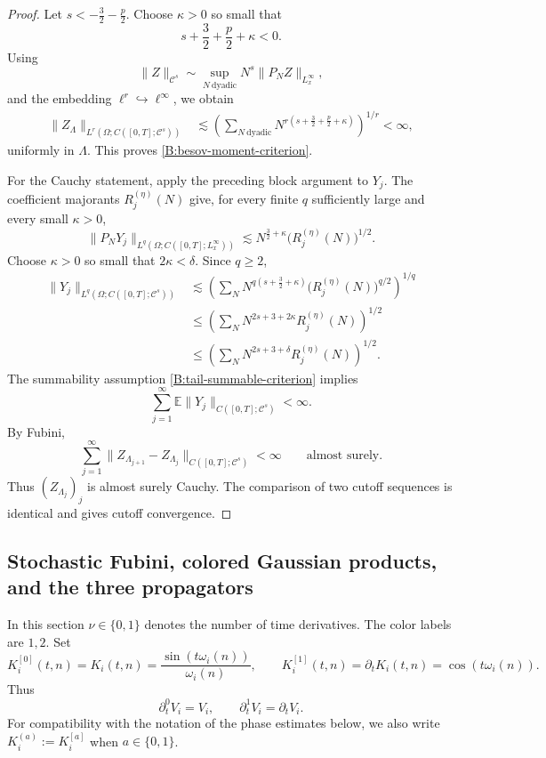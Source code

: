 \documentclass[10pt]{amsart}
\numberwithin{equation}{section}
\theoremstyle{plain}
\theoremstyle{definition}
\theoremstyle{remark}
\newcommand{\E}{\mathbb{E}}
\newcommand{\C}{\mathcal{C}}
\begin{document}
\begin{proof}
Let \(s<-\frac{3}{2}-\frac{p}{2}\).  Choose \(\kappa>0\) so small that
\[
        s+\frac{3}{2}+\frac{p}{2}+\kappa<0.
\]
Using
\[
        \|Z\|_{\C^s}
        \sim
        \sup_{N\ \mathrm{dyadic}}N^s\|P_NZ\|_{L^\infty_x},
\]
and the embedding \(\ell^r\hookrightarrow\ell^\infty\), we obtain
\[
\begin{aligned}
        \|Z_\Lambda\|_{L^r(\Omega;C([0,T];\C^s))}
        &\lesssim
        \left(
        \sum_{N\ \mathrm{dyadic}}
        N^{r(s+\frac{3}{2}+\frac{p}{2}+\kappa)}
        \right)^{1/r}<\infty,
\end{aligned}
\]
uniformly in \(\Lambda\).  This proves \eqref{B:besov-moment-criterion}.

For the Cauchy statement, apply the preceding block argument to \(Y_j\).  The coefficient majorants \(R_j^{(\eta)}(N)\) give, for every finite \(q\) sufficiently large and every small \(\kappa>0\),
\[
        \|P_NY_j\|_{L^q(\Omega;C([0,T];L^\infty_x))}
        \lesssim
        N^{\frac{3}{2}+\kappa}\bigl(R_j^{(\eta)}(N)\bigr)^{1/2}.
\]
Choose \(\kappa>0\) so small that \(2\kappa<\delta\).  Since \(q\ge2\),
\[
\begin{aligned}
        \|Y_j\|_{L^q(\Omega;C([0,T];\C^s))}
        &\lesssim
        \left(
        \sum_N
        N^{q(s+\frac{3}{2}+\kappa)}
        \bigl(R_j^{(\eta)}(N)\bigr)^{q/2}
        \right)^{1/q} \\
        &\le
        \left(
        \sum_N
        N^{2s+3+2\kappa}R_j^{(\eta)}(N)
        \right)^{1/2} \\
        &\le
        \left(
        \sum_N
        N^{2s+3+\delta}R_j^{(\eta)}(N)
        \right)^{1/2}.
\end{aligned}
\]
The summability assumption \eqref{B:tail-summable-criterion} implies
\[
        \sum_{j=1}^\infty
        \E\|Y_j\|_{C([0,T];\C^s)}<\infty.
\]
By Fubini,
\[
        \sum_{j=1}^\infty
        \|Z_{\Lambda_{j+1}}-Z_{\Lambda_j}\|_{C([0,T];\C^s)}<\infty
        \qquad\text{almost surely}.
\]
Thus \((Z_{\Lambda_j})_j\) is almost surely Cauchy.  The comparison of two cutoff sequences is identical and gives cutoff convergence.
\end{proof}

\subsection{Stochastic Fubini, colored Gaussian products, and the three propagators}

In this section \(\nu\in\{0,1\}\) denotes the number of time derivatives.  The color labels are \(1,2\).  Set
\[
        K_i^{[0]}(t,n)=K_i(t,n)=\frac{\sin(t\omega_i(n))}{\omega_i(n)},
        \qquad
        K_i^{[1]}(t,n)=\partial_tK_i(t,n)=\cos(t\omega_i(n)).
\]
Thus
\[
        \partial_t^0V_i=V_i,
        \qquad
        \partial_t^1V_i=\partial_tV_i.
\]
For compatibility with the notation of the phase estimates below, we also write \(K_i^{(a)}:=K_i^{[a]}\) when \(a\in\{0,1\}\).
\end{document}
